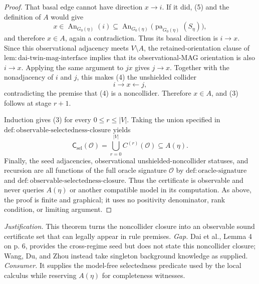 \documentclass{article}
\begin{document}
\begin{proof}
That basal edge cannot have direction \(x\to i\).  If it did, (5) and the definition of \(A\) would give
\[
x\in\operatorname{An}_{G_0(\eta)}(i)
\subseteq
\operatorname{An}_{G_0(\eta)}
   \bigl(\operatorname{pa}_{G_0(\eta)}(S_\eta)\bigr),
\]
and therefore \(x\in A\), again a contradiction.  Thus its basal direction is \(i\to x\).  Since this observational adjacency meets \(V\setminus A\), the retained-orientation clause of \(\mathrm{lem:dai\mbox{-}twin\mbox{-}mag\mbox{-}interface}\) implies that its observational-MAG orientation is also \(i\to x\).  Applying the same argument to \(jx\) gives \(j\to x\).  Together with the nonadjacency of \(i\) and \(j\), this makes (4) the unshielded collider
\[
i\to x\leftarrow j,
\]
contradicting the premise that (4) is a noncollider.  Therefore \(x\in A\), and (3) follows at stage \(r+1\).

Induction gives (3) for every \(0\le r\le |V|\).  Taking the union specified in \(\mathrm{def:observable\mbox{-}selectedness\mbox{-}closure}\) yields
\[
\mathsf C_{\mathrm{sel}}(\mathcal O)
=\bigcup_{r=0}^{|V|}C^{(r)}(\mathcal O)
\subseteq A(\eta).
\]
Finally, the seed adjacencies, observational unshielded-noncollider statuses, and recursion are all functions of the full oracle signature \(\mathcal O\) by \(\mathrm{def:oracle\mbox{-}signature}\) and \(\mathrm{def:observable\mbox{-}selectedness\mbox{-}closure}\).  Thus the certificate is observable and never queries \(A(\eta)\) or another compatible model in its computation.  As above, the proof is finite and graphical; it uses no positivity denominator, rank condition, or limiting argument.
\end{proof}
\par\smallskip\noindent \textit{Justification.} This theorem turns the noncollider closure into an observable sound certificate set that can legally appear in rule premises. \textit{Gap.} Dai et al., Lemma 4 on p. 6, provides the cross-regime seed but does not state this noncollider closure; Wang, Du, and Zhou instead take singleton background knowledge as supplied. \textit{Consumer.} It supplies the model-free selectedness predicate used by the local calculus while reserving \(A(\eta)\) for completeness witnesses.
\end{document}
